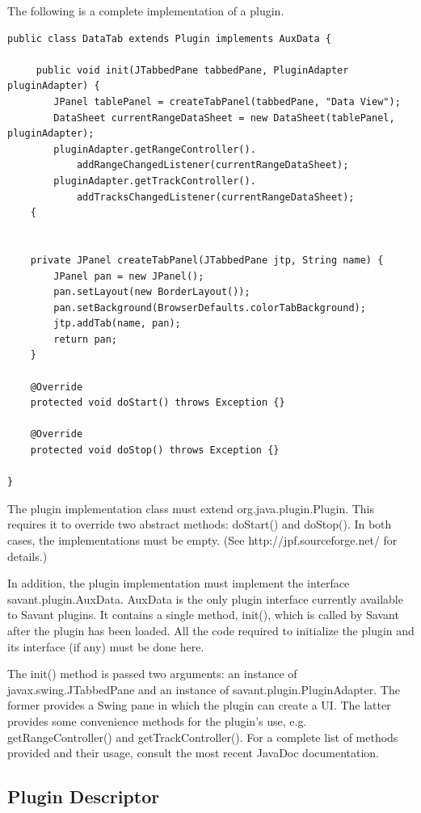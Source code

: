\documentclass{report}
\begin{document}
The following is a complete implementation of a plugin.

\begin{verbatim}
public class DataTab extends Plugin implements AuxData {

     public void init(JTabbedPane tabbedPane, PluginAdapter pluginAdapter) {
        JPanel tablePanel = createTabPanel(tabbedPane, "Data View");
        DataSheet currentRangeDataSheet = new DataSheet(tablePanel, pluginAdapter);
        pluginAdapter.getRangeController().
            addRangeChangedListener(currentRangeDataSheet);
        pluginAdapter.getTrackController().
            addTracksChangedListener(currentRangeDataSheet);
    {
    

    private JPanel createTabPanel(JTabbedPane jtp, String name) {
        JPanel pan = new JPanel();
        pan.setLayout(new BorderLayout());
        pan.setBackground(BrowserDefaults.colorTabBackground);
        jtp.addTab(name, pan);
        return pan;
    }

    @Override
    protected void doStart() throws Exception {}

    @Override
    protected void doStop() throws Exception {}

}
\end{verbatim}    

The plugin implementation class must extend org.java.plugin.Plugin. This requires it to override two abstract methods: doStart() and doStop(). In both cases, the implementations must be empty. (See http://jpf.sourceforge.net/ for details.)

In addition, the plugin implementation must implement the interface savant.plugin.AuxData. AuxData is the only plugin interface currently available to Savant plugins. It contains a single method, init(), which is called by Savant after the plugin has been loaded. All the code required to initialize the plugin and its interface (if any) must be done here. 

The init() method is passed two arguments: an instance of javax.swing.JTabbedPane and an instance of savant.plugin.PluginAdapter. The former provides a Swing pane in which the plugin can create a UI. The latter provides some convenience methods for the plugin's use, e.g. getRangeController() and getTrackController(). For a complete list of methods provided and their usage, consult the most recent JavaDoc documentation.

\subsection{Plugin Descriptor}
\end{document}
